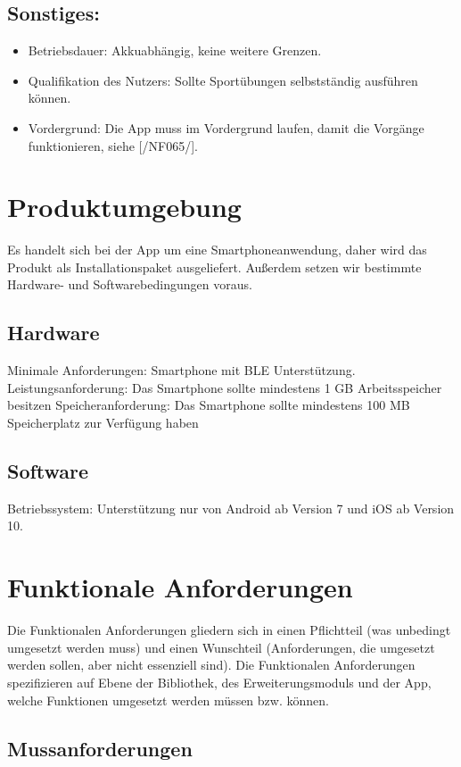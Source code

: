 \documentclass[a4paper,12pt]{article}
\begin{document}
    \subsection{Sonstiges:}
    \begin{itemize}
      \item \textsf{Betriebsdauer:} \glqq Akkuabhängig\grqq, keine weitere Grenzen.
      \item \textsf{Qualifikation des Nutzers:} Sollte Sportübungen selbstständig ausführen können.
      \item \textsf{Vordergrund:} Die App muss im Vordergrund laufen, damit die Vorgänge funktionieren, siehe [/NF065/].
    \end{itemize}
      
\section{Produktumgebung}
Es handelt sich bei der App um eine Smartphoneanwendung, daher wird das Produkt als Installationspaket ausgeliefert. Außerdem setzen wir bestimmte Hardware- und Softwarebedingungen voraus.
\subsection{Hardware} 
	\textsf{Minimale Anforderungen:} Smartphone mit \Gls{BLE} Unterstützung.
	\textsf{Leistungsanforderung:} Das Smartphone sollte mindestens 1 GB Arbeitsspeicher besitzen
	\textsf{Speicheranforderung:} Das Smartphone sollte mindestens 100 MB Speicherplatz zur Verfügung haben
\subsection{Software} \textsf{Betriebssystem:} Unterstützung nur von Android ab Version 7 und iOS ab Version 10.

\section{Funktionale Anforderungen}
Die Funktionalen Anforderungen gliedern sich in einen Pflichtteil (was unbedingt umgesetzt werden muss) und einen Wunschteil (Anforderungen, die umgesetzt werden sollen, aber nicht essenziell sind). Die Funktionalen Anforderungen spezifizieren auf Ebene der Bibliothek, des Erweiterungsmoduls und der App, welche Funktionen umgesetzt werden müssen bzw. können. 
  \subsection{Mussanforderungen}
\end{document}
